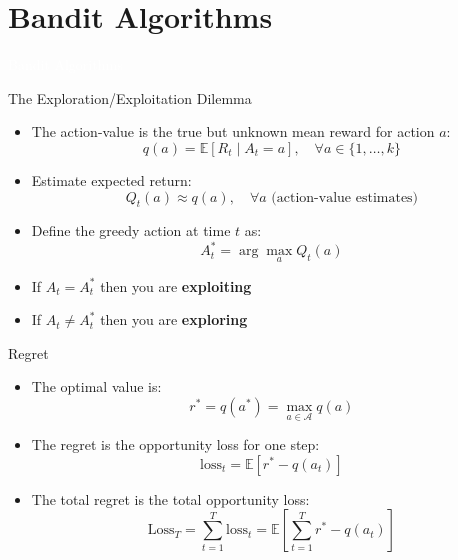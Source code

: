 \documentclass[11pt,table]{beamer}
\begin{document}
\section{Bandit Algorithms}
{
\begin{frame}
\centering
\Huge
\textcolor{white}{Bandit Algorithms}
\thispagestyle{empty}
\end{frame}
}



\begin{frame}{The Exploration/Exploitation Dilemma}
\begin{itemize}
  \item The action-value is the true but unknown mean reward for action $a$:
  \[
  q(a) = \mathbb{E}[R_t \mid A_t = a], \quad \forall a \in \{1, \dots, k\}
  \]
  \item Estimate expected return:
  \[
  Q_t(a) \approx q(a), \quad \forall a \text{ (action-value estimates)}
  \]
  \item Define the greedy action at time $t$ as:
  \[
  A_t^* = \arg\max_a Q_t(a)
  \]
  \item If $A_t = A_t^*$ then you are \textbf{exploiting}
  \item If $A_t \neq A_t^*$ then you are \textbf{exploring}
\end{itemize}
\end{frame}

\begin{frame}{Regret}
\begin{itemize}
  \item The optimal value is:
  \[
  r^* = q(a^*) = \max_{a \in \mathcal{A}} q(a)
  \]
  \item The regret is the opportunity loss for one step:
  \[
  \text{loss}_t = \mathbb{E}[r^* - q(a_t)]
  \]
  \item The total regret is the total opportunity loss:
  \[
  \text{Loss}_T = \sum_{t=1}^{T}\text{loss}_t = \mathbb{E}\left[ \sum_{t=1}^{T} r^* - q(a_t) \right]
  \]

\end{itemize}
\end{frame}
\end{document}
